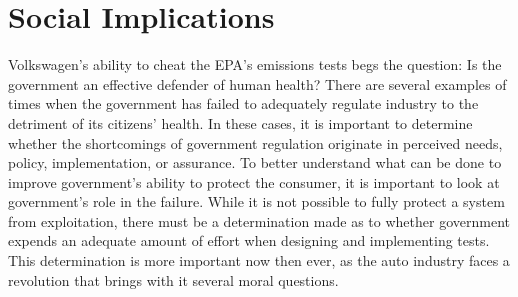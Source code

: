 \section{Social Implications}
Volkswagen's ability to cheat the EPA's emissions tests begs the question: Is the government an effective defender of human health? There are several examples of times when the government has failed to adequately regulate industry to the detriment of its citizens' health\cite{9_11_report,2008_housing_crisis}. In these cases, it is important to determine whether the shortcomings of government regulation originate in perceived needs, policy, implementation, or assurance\cite{what_is_security}. To better understand what can be done to improve government's ability to protect the consumer, it is important to look at government's role in the failure. While it is not possible to fully protect a system from exploitation, there must be a determination made as to whether government expends an adequate amount of effort when designing and implementing tests. This determination is more important now then ever, as the auto industry faces a revolution that brings with it several moral questions\cite{software_engineering_analysis}.